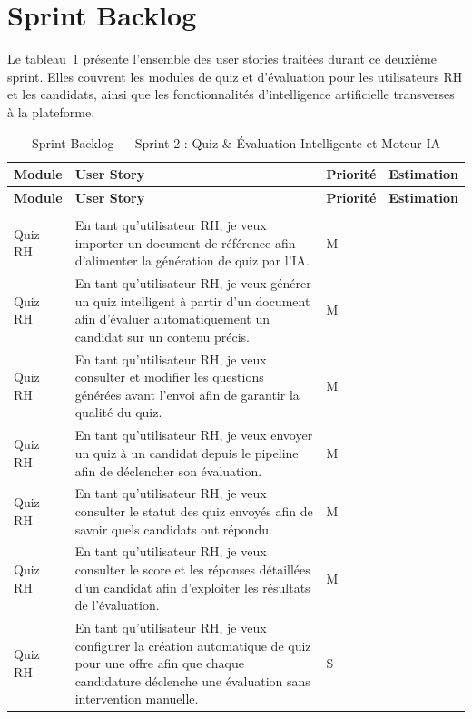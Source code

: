 \section{Sprint Backlog}

Le tableau~\ref{tab:sprint2_backlog} présente l'ensemble des user stories traitées durant ce deuxième sprint. Elles couvrent les modules de quiz et d'évaluation pour les utilisateurs RH et les candidats, ainsi que les fonctionnalités d'intelligence artificielle transverses à la plateforme.

\renewcommand{\arraystretch}{1.4}
\setlength{\tabcolsep}{8pt}

\begin{small}
\begin{longtable}{|p{2.5cm}|p{6.8cm}|>{\centering\arraybackslash}p{2.2cm}|>{\centering\arraybackslash}p{2.2cm}|}
\caption{Sprint Backlog — Sprint 2 : Quiz \& Évaluation Intelligente et Moteur IA}
\label{tab:sprint2_backlog} \\
\hline
\rowcolor[HTML]{EFEFEF}
\textbf{Module} & \textbf{User Story} & \textbf{Priorité} & \textbf{Estimation} \\ \hline
\endfirsthead

\hline
\rowcolor[HTML]{EFEFEF}
\textbf{Module} & \textbf{User Story} & \textbf{Priorité} & \textbf{Estimation} \\ \hline
\endhead

\hline
\endfoot
\hline
\endlastfoot

\multicolumn{4}{|l|}{\cellcolor[HTML]{F2F2F2}\textbf{Quiz et Évaluation — Utilisateur RH}} \\ \hline
Quiz RH & En tant qu'utilisateur RH, je veux importer un document de référence afin d'alimenter la génération de quiz par l'IA. & M & 3 \\ \hline
Quiz RH & En tant qu'utilisateur RH, je veux générer un quiz intelligent à partir d'un document afin d'évaluer automatiquement un candidat sur un contenu précis. & M & 5 \\ \hline
Quiz RH & En tant qu'utilisateur RH, je veux consulter et modifier les questions générées avant l'envoi afin de garantir la qualité du quiz. & M & 3 \\ \hline
Quiz RH & En tant qu'utilisateur RH, je veux envoyer un quiz à un candidat depuis le pipeline afin de déclencher son évaluation. & M & 2 \\ \hline
Quiz RH & En tant qu'utilisateur RH, je veux consulter le statut des quiz envoyés afin de savoir quels candidats ont répondu. & M & 2 \\ \hline
Quiz RH & En tant qu'utilisateur RH, je veux consulter le score et les réponses détaillées d'un candidat afin d'exploiter les résultats de l'évaluation. & M & 3 \\ \hline
Quiz RH & En tant qu'utilisateur RH, je veux configurer la création automatique de quiz pour une offre afin que chaque candidature déclenche une évaluation sans intervention manuelle. & S & 3 \\ \hline


\end{longtable}
\end{small}
